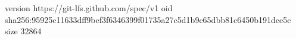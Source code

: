 version https://git-lfs.github.com/spec/v1
oid sha256:95925c11633dff9bef3f6346399f01735a27c5d1b9c65dbb81c6450b191dee5c
size 32864
